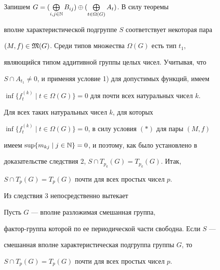 \begin{pf}


Запишем $G=(\bigoplus\limits_{i,j\in\Bbb N}B_{ij})


\oplus(\bigoplus\limits_{t\in\Omega(G)}A_t)$. В силу теоремы


вполне характеристической подгруппе $S$  соответствует некоторая пара


$(M, f)\in\frak M(G)$. Среди типов множества $\Omega(G)$ есть тип $t_1$,


являющийся типом аддитивной группы целых чисел. Учитывая, что


$S\cap A_{t_1}\ne 0$, и применяя условие 1) для допустимых функций, имеем


$\inf\{f_t^{(k)}\mid t\in\Omega(G)\}=0$ для почти всех натуральных чисел $k$.


Для всех таких натуральных чисел $k$, для которых


$\inf\{f_t^{(k)}\mid t\in\Omega(G)\}=0$, в силу условия $(\ast)$ для пары $(M, f)$


имеем $\sup\{m_{kj}\mid j\in\Bbb N\}=0$, и поэтому, как было установлено в


доказательстве следствия 2, $S\cap T_{p_k}(G)=T_{p_k}(G)$. Итак,


$S\cap T_p(G)=T_p(G)$ почти для всех простых чисел $p$.


\end{pf}





Из следствия 3 непосредственно вытекает





\begin{cor}


Пусть $G$ --- вполне разложимая смешанная группа,


фактор-группа которой по ее периодической части свободна. Если $S$ ---


смешанная вполне характеристическая подгруппа группы $G$, то


${S\cap T_p(G)=T_p(G)}$ почти для всех простых чисел $p$.


\end{cor}








